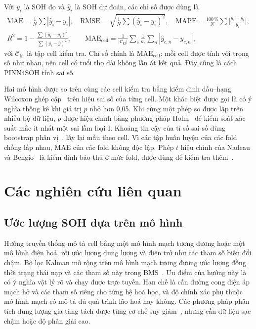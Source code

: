 Với $y_i$ là SOH đo và $\hat y_i$ là SOH dự đoán, các chỉ số được dùng là
\begin{gather}
\mathrm{MAE} = \tfrac{1}{N}\textstyle\sum|\hat y_i - y_i|, \quad
\mathrm{RMSE} = \sqrt{\tfrac{1}{N}\textstyle\sum(\hat y_i - y_i)^2}, \quad
\mathrm{MAPE} = \tfrac{100\,\%}{N}\textstyle\sum\big|\tfrac{\hat y_i - y_i}{y_i}\big|, \\
R^2 = 1 - \frac{\sum(\hat y_i - y_i)^2}{\sum(y_i - \bar y)^2}, \qquad
\mathrm{MAE}_\text{cell} = \frac{1}{|\mathcal{C}_\text{kt}|}\sum_{c}\frac{1}{n_c}\sum_{n}|\hat y_{c,n} - y_{c,n}|,
\end{gather}
với $\mathcal{C}_\text{kt}$ là tập cell kiểm tra. Chỉ số chính là $\mathrm{MAE}_\text{cell}$: mỗi cell được tính với trọng
số như nhau, nên cell có tuổi thọ dài không lấn át kết quả. Đây cũng là cách PINN4SOH tính sai số.

Hai mô hình được so trên cùng các cell kiểm tra bằng kiểm định dấu--hạng Wilcoxon ghép cặp~\cite{wilcoxon1945} trên hiệu
sai số của từng cell. Một khác biệt được gọi là có ý nghĩa thống kê khi giá trị $p$ nhỏ hơn 0,05. Khi cùng một phép so
được lặp trên nhiều bộ dữ liệu, $p$ được hiệu chỉnh bằng phương pháp Holm~\cite{holm1979} để kiểm soát xác suất mắc ít
nhất một sai lầm loại I. Khoảng tin cậy của tỉ số sai số dùng bootstrap phân vị~\cite{efron1993}, lấy lại mẫu theo cell.
Vì các tập huấn luyện của các fold chồng lấp nhau, MAE của các fold không độc lập. Phép $t$ hiệu chỉnh của Nadeau và
Bengio~\cite{nadeau2003,bouckaert2004} là kiểm định bảo thủ ở mức fold, được dùng để kiểm tra thêm~\cite{dietterich1998}.

\section{Các nghiên cứu liên quan}\label{sec:lienquan}

\subsection{Ước lượng SOH dựa trên mô hình}

Hướng truyền thống mô tả cell bằng một mô hình mạch tương đương hoặc một mô hình điện hoá, rồi ước lượng dung lượng và
điện trở như các tham số biến đổi chậm. Bộ lọc Kalman mở rộng trên mô hình mạch tương đương ước lượng đồng thời trạng
thái nạp và các tham số này trong BMS~\cite{plett2004}. Ưu điểm của hướng này là có ý nghĩa vật lý rõ và chạy được trực
tuyến. Hạn chế là cần đường cong điện áp mạch hở và các tham số riêng cho từng hệ hoá học, và độ chính xác phụ thuộc mô
hình mạch có mô tả đủ quá trình lão hoá hay không. Các phương pháp phân tích dung lượng gia tăng tách được từng cơ chế
suy giảm~\cite{dubarry2012}, nhưng cần dữ liệu sạc chậm hoặc độ phân giải cao.

